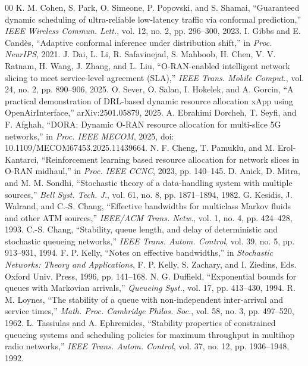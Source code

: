 \documentclass[journal]{IEEEtran}
\begin{document}
\begin{thebibliography}{00}
 K. M. Cohen, S. Park, O. Simeone, P. Popovski, and S. Shamai, ``Guaranteed dynamic scheduling of ultra-reliable low-latency traffic via conformal prediction,'' \emph{IEEE Wireless Commun. Lett.}, vol. 12, no. 2, pp. 296--300, 2023.
 I. Gibbs and E. Cand\`es, ``Adaptive conformal inference under distribution shift,'' in \emph{Proc. NeurIPS}, 2021.
 J. Dai, L. Li, R. Safavinejad, S. Mahboob, H. Chen, V. V. Ratnam, H. Wang, J. Zhang, and L. Liu, ``O-RAN-enabled intelligent network slicing to meet service-level agreement (SLA),'' \emph{IEEE Trans. Mobile Comput.}, vol. 24, no. 2, pp. 890--906, 2025.
 O. Sever, O. Salan, I. Hokelek, and A. Gorcin, ``A practical demonstration of DRL-based dynamic resource allocation xApp using OpenAirInterface,'' arXiv:2501.05879, 2025.
 A. Ebrahimi Dorcheh, T. Seyfi, and F. Afghah, ``DORA: Dynamic O-RAN resource allocation for multi-slice 5G networks,'' in \emph{Proc. IEEE MECOM}, 2025, doi: 10.1109/MECOM67453.2025.11439664.
 N. F. Cheng, T. Pamuklu, and M. Erol-Kantarci, ``Reinforcement learning based resource allocation for network slices in O-RAN midhaul,'' in \emph{Proc. IEEE CCNC}, 2023, pp. 140--145.
 D. Anick, D. Mitra, and M. M. Sondhi, ``Stochastic theory of a data-handling system with multiple sources,'' \emph{Bell Syst. Tech. J.}, vol. 61, no. 8, pp. 1871--1894, 1982.
 G. Kesidis, J. Walrand, and C.-S. Chang, ``Effective bandwidths for multiclass Markov fluids and other ATM sources,'' \emph{IEEE/ACM Trans. Netw.}, vol. 1, no. 4, pp. 424--428, 1993.
 C.-S. Chang, ``Stability, queue length, and delay of deterministic and stochastic queueing networks,'' \emph{IEEE Trans. Autom. Control}, vol. 39, no. 5, pp. 913--931, 1994.
 F. P. Kelly, ``Notes on effective bandwidths,'' in \emph{Stochastic Networks: Theory and Applications}, F. P. Kelly, S. Zachary, and I. Ziedins, Eds. Oxford Univ. Press, 1996, pp. 141--168.
 N. G. Duffield, ``Exponential bounds for queues with Markovian arrivals,'' \emph{Queueing Syst.}, vol. 17, pp. 413--430, 1994.
 R. M. Loynes, ``The stability of a queue with non-independent inter-arrival and service times,'' \emph{Math. Proc. Cambridge Philos. Soc.}, vol. 58, no. 3, pp. 497--520, 1962.
 L. Tassiulas and A. Ephremides, ``Stability properties of constrained queueing systems and scheduling policies for maximum throughput in multihop radio networks,'' \emph{IEEE Trans. Autom. Control}, vol. 37, no. 12, pp. 1936--1948, 1992.

\end{thebibliography}
\end{document}
